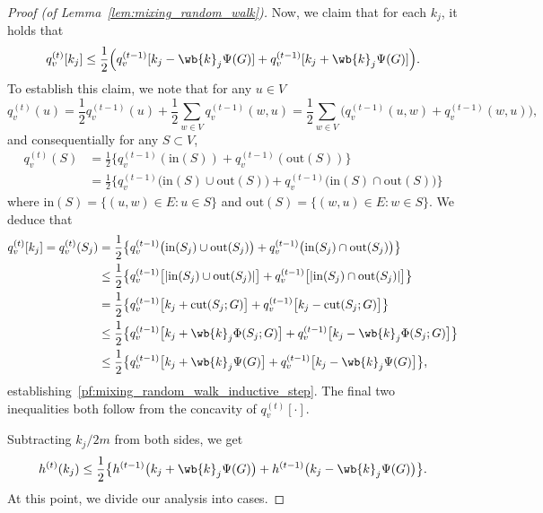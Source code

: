 \documentclass{article}
\newcommand{\1}{\mathbf{1}}
\theoremstyle{definition}
\theoremstyle{remark}
\begin{document}
\begin{proof}[Proof (of Lemma~\ref{lem:mixing_random_walk})]
	Now, we claim that for each $k_j$, it holds that
	\begin{equation}
	\label{pf:mixing_random_walk_inductive_step}
	q_v^{(t)}[k_j] \leq \frac{1}{2}\Bigl(q_v^{(t - 1)}[k_j - \wb{k}_j \Psi(G)] + q_v^{(t - 1)}[k_j + \wb{k}_j \Psi(G)]\Bigr).
	\end{equation}
	To establish this claim, we note that for any $u \in V$
	\begin{equation*}
	q_v^{(t)}(u) = \frac{1}{2}q_v^{(t - 1)}(u) + \frac{1}{2}\sum_{w \in V}q_v^{(t - 1)}(w,u) = \frac{1}{2} \sum_{w \in V} \bigl(q_v^{(t - 1)}(u,w) + q_v^{(t - 1)}(w,u)\bigr),
	\end{equation*}
	and consequentially for any $S \subset V$,
	\begin{align*}
	q_v^{(t)}(S) & = \frac{1}{2}\bigl\{q_v^{(t - 1)}(\mathrm{in}(S)) +  q_v^{(t - 1)}(\mathrm{out}(S))\bigr\} \\
	& = \frac{1}{2}\bigl\{q_v^{(t - 1)}\bigl(\mathrm{in}(S) \cup \mathrm{out}(S)\bigr) +  q_v^{(t - 1)}\bigl(\mathrm{in}(S) \cap \mathrm{out}(S)\bigr)\bigr\}
	\end{align*}
	where $\mathrm{in}(S) = \{(u,w) \in E: u \in S\}$ and $\mathrm{out}(S) = \{(w,u) \in E: w \in S\}$. We deduce that
	\begin{align*}
	q_v^{(t)}[k_j] = q_v^{(t)}(S_j) & = \frac{1}{2}\bigl\{q_v^{(t - 1)}\bigl(\mathrm{in}(S_j) \cup \mathrm{out}(S_j)\bigr) +  q_v^{(t - 1)}\bigl(\mathrm{in}(S_j) \cap \mathrm{out}(S_j)\bigr)\bigr\} \\
	& \leq \frac{1}{2}\bigl\{q_v^{(t - 1)}\bigl[|\mathrm{in}(S_j) \cup \mathrm{out}(S_j)|\bigr] +  q_v^{(t - 1)}\bigl[|\mathrm{in}(S_j) \cap \mathrm{out}(S_j)|\bigr]\bigr\} \\
	& = \frac{1}{2}\bigl\{q_v^{(t - 1)}\bigl[k_j + \mathrm{cut}(S_j;G)\bigr] +  q_v^{(t - 1)}\bigl[k_j - \mathrm{cut}(S_j;G)\bigr]\bigr\} \\
	& \leq \frac{1}{2}\bigl\{q_v^{(t - 1)}\bigl[k_j + \wb{k}_j\Phi(S_j;G)\bigr] +  q_v^{(t - 1)}\bigl[k_j - \wb{k}_j\Phi(S_j;G)\bigr]\bigr\} \\
	& \leq \frac{1}{2}\bigl\{q_v^{(t - 1)}\bigl[k_j + \wb{k}_j\Psi(G)\bigr] +  q_v^{(t - 1)}\bigl[k_j - \wb{k}_j\Psi(G)\bigr]\bigr\},
	\end{align*}
	establishing~\eqref{pf:mixing_random_walk_inductive_step}. The final two inequalities both follow from the concavity of $q_v^{(t)}[\cdot]$. 
	
	Subtracting $k_j/2m$ from both sides, we get
	\begin{equation}
	\label{pf:mixing_random_walk_inductive_step_h}
	h^{(t)}(k_j) \leq \frac{1}{2}\bigl\{h^{(t - 1)}\bigl(k_j + \wb{k}_j\Psi(G)\bigr)+  h^{(t - 1)}\bigl(k_j - \wb{k}_j\Psi(G)\bigr)\bigr\}.
	\end{equation}
	At this point, we divide our analysis into cases.
	

\end{proof}
\end{document}
